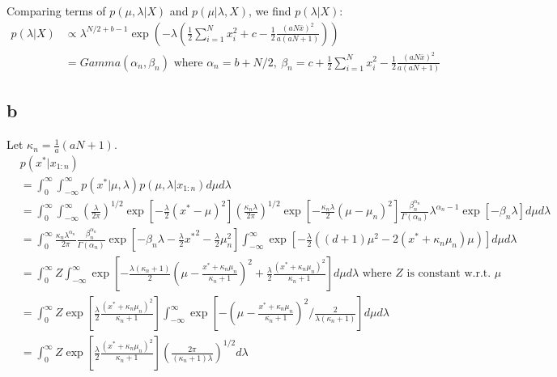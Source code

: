 \documentclass[twoside]{homework}
\begin{document}
Comparing terms of $p(\mu, \lambda | X)$ and $p(\mu | \lambda, X)$, we find $p(\lambda | X)$:
\begin{align*}
p(\lambda | X) 
&\propto \lambda^{N/2 + b -1} \exp \left(-\lambda \left(\frac{1}{2} \sum_{i=1}^N x_i^2 + c - \frac{1}{2} \frac{(aN \bar{x})^2} {a(aN + 1)} \right) \right)\\
&= Gamma(\alpha_n, \beta_n) \textrm{ where } \alpha_n =  b+ N/2,\ \beta_n = c + \frac{1}{2} \sum_{i=1}^N x_i^2 - \frac{1}{2} \frac{(aN \bar{x})^2} {a(aN + 1)}
\end{align*}

\newpage
\subsection*{b}
Let $\kappa_{n} = \frac{1}{a}(aN + 1)$.
\begin{align*}
& p(x^{*} | x_{1:n})\\
& = \int_{0}^{\infty} \int_{-\infty}^{\infty} p(x^{*} | \mu, \lambda) p(\mu, \lambda | x_{1:n}) d\mu d\lambda\\
&= \int_{0}^{\infty} \int_{-\infty}^{\infty} \left (\frac{\lambda}{2\pi} \right)^{1/2} \exp \left[-\frac{\lambda}{2}(x^{*} - \mu)^2 \right] \left (\frac{\kappa_n \lambda}{2\pi} \right)^{1/2} \exp \left[-\frac{\kappa_n \lambda}{2}(\mu - \mu_n)^2 \right] \frac{\beta_n^{\alpha_n}}{\Gamma(\alpha_n)} \lambda^{\alpha_n -1} \exp[-\beta_n \lambda] d\mu d\lambda \\
&= \int_{0}^{\infty} \frac{\kappa_n \lambda^{\alpha_n}}{2\pi} \frac{\beta_n^{\alpha_n}}{\Gamma(\alpha_n)} \exp \left[-\beta_n \lambda - \frac{\lambda}{2} {x^{*}}^2 - \frac{\lambda}{2} \mu_n^2 \right] \int_{-\infty}^{\infty} \exp \left[-\frac{\lambda}{2} ((d+1)\mu^2 - 2(x^{*} + \kappa_n \mu_n)\mu) \right] d\mu d\lambda \\
&= \int_{0}^{\infty} Z \int_{-\infty}^{\infty} \exp \left[-\frac{\lambda(\kappa_n + 1)}{2} \left( \mu - \frac{x^{*} + \kappa_n \mu_n}{\kappa_n +1} \right)^2 +  \frac{\lambda}{2} \frac{(x^{*} + \kappa_n \mu_n)^2}{\kappa_n +1}  \right] d\mu d\lambda \textrm{ where } Z \textrm{ is constant w.r.t. } \mu \\
&= \int_{0}^{\infty} Z \exp \left[\frac{\lambda}{2} \frac{(x^{*} + \kappa_n \mu_n)^2}{\kappa_n +1}  \right] \int_{-\infty}^{\infty} \exp \left[- \left( \mu - \frac{x^{*} + \kappa_n \mu_n}{\kappa_n +1} \right)^2 / \frac{2}{\lambda(\kappa_n +1)}\right] d\mu d\lambda\\
&= \int_{0}^{\infty} Z \exp \left[\frac{\lambda}{2} \frac{(x^{*} + \kappa_n \mu_n)^2}{\kappa_n +1}  \right] \left( \frac{2 \pi}{(\kappa_n + 1)\lambda} \right)^{1/2} d\lambda \\

\end{align*}
\end{document}
